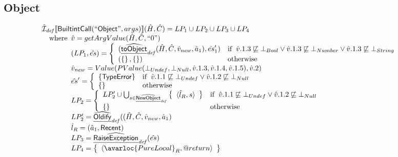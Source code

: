 \subsection{Object}
\[
\begin{array}{l}
\aI_{\it def}\lbr \SF{BuiltintCall}(``\SF{Object}",args)\rbr(\hat{H},\hat{C}) = LP_1 \cup LP_2 \cup LP_3 \cup LP_4\\
\quad\wherec{
  \hat{v} = getArgValue(\hat{H}, \hat{C}, ``0")\\
  (LP_1, \hat{es}) = \left\{\begin{array}{ll}
      (\ahf{toObject}_{\it def}(\hat{H},\hat{C}, \hat{v}_{new}, \hat{a}_1), \hat{es}_1')
      & \ifc{\hat{v}.1.3 \not\sqsubseteq \bot_{Bool} \lor \hat{v}.1.3 \not\sqsubseteq \bot_{Number} \lor \hat{v}.1.3 \not\sqsubseteq \bot_{String}}\\
      (\set{}, \set{}) & \owc
    \end{array}\right.\\
  \hat{v}_{new} = Value(PValue(\bot_{Undef}, \bot_{Null}, \hat{v}.1.3, \hat{v}.1.4, \hat{v}.1.5), \hat{v}.2)\\
  \hat{es}' = \left\{\begin{array}{ll}
      \{ \SF{TypeError} \}
      & \ifc{\hat{v}.1.1 \not\sqsubseteq \bot_{Undef} \lor \hat{v}.1.2 \not\sqsubseteq \bot_{Null}}\\
      \set{} & \owc
    \end{array}\right.\\
  LP_2 = \left\{\begin{array}{ll}
      LP_2' \cup \bigcup_{s \in \ahf{NewObject}_{\it def}} \set{\langle \hat{l}_R, s \rangle}
      & \ifc{\hat{v}.1.1 \not\sqsubseteq \bot_{Undef} \lor \hat{v}.1.2 \not\sqsubseteq \bot_{Null}}\\
      \set{} & \owc
    \end{array}\right.\\
  LP_2' = \ahf{Oldify}_{\it def}((\hat{H},\hat{C}, \hat{v}_{new}, \hat{a}_1)\\
  \hat{l}_R = (\hat{a}_1, \SF{Recent})\\
  LP_3 = \ahf{RaiseException}_{\it def}(\hat{es})\\
  LP_4 = \set{\langle\avarloc{PureLocal}_R,\varprop{return}\rangle}\\
  }\\
\\


\end{array}\]
